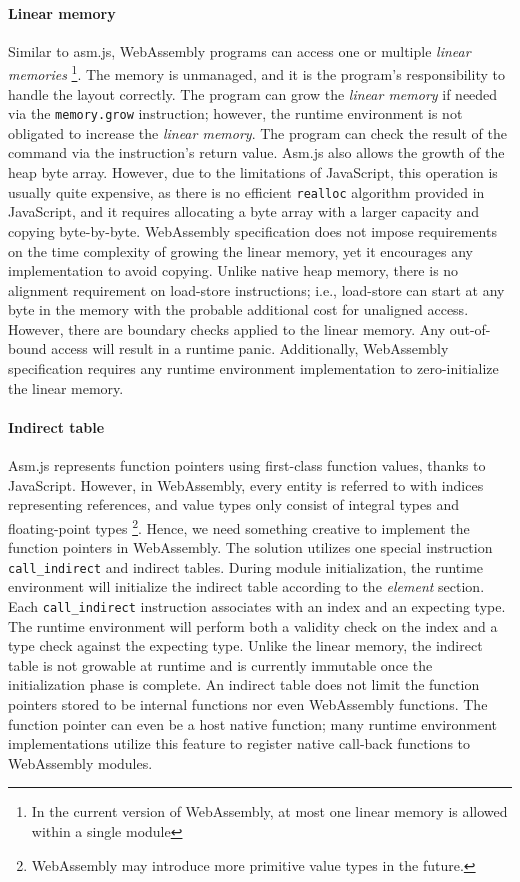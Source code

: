 \paragraph{Linear memory}
Similar to asm.js, WebAssembly programs can access one or multiple
\emph{linear memories} \footnote{In the current version of WebAssembly, at most
  one linear memory is allowed within a single module}. The memory is unmanaged,
and it is the program's responsibility to handle the layout correctly. The
program can grow the \emph{linear memory} if needed via the \texttt{memory.grow}
instruction; however, the runtime environment is not obligated to increase the
\emph{linear memory}. The program can check the result of the command via the
instruction's return value. Asm.js also allows the growth of the heap byte
array. However, due to the limitations of JavaScript, this operation is usually
quite expensive, as there is no efficient \texttt{realloc} algorithm provided in
JavaScript, and it requires allocating a byte array with a larger capacity and
copying byte-by-byte. WebAssembly specification does not impose requirements on
the time complexity of growing the linear memory, yet it encourages any
implementation to avoid copying.  Unlike native heap memory, there is no
alignment requirement on load-store instructions; i.e., load-store can start at
any byte in the memory with the probable additional cost for unaligned access.
However, there are boundary checks applied to the linear memory. Any
out-of-bound access will result in a runtime panic. Additionally, WebAssembly
specification requires any runtime environment implementation to
zero-initialize the linear memory.

\paragraph{Indirect table}
Asm.js represents function pointers using first-class function values, thanks to
JavaScript. However, in WebAssembly, every entity is referred to with indices
representing references, and value types only consist of integral types and
floating-point types \footnote{WebAssembly may introduce more primitive value
  types in the future.}. Hence, we need something creative to implement the
function pointers in WebAssembly. The solution utilizes one special instruction
\texttt{call\_indirect} and indirect tables. During module initialization, the
runtime environment will initialize the indirect table according to the
\emph{element} section. Each \texttt{call\_indirect} instruction associates
with an index and an expecting type. The runtime environment will perform both
a validity check on the index and a type check against the expecting type.
Unlike the linear memory, the indirect table is not growable at runtime and
is currently immutable once the initialization phase is complete. An indirect
table does not limit the function pointers stored to be internal functions nor
even WebAssembly functions. The function pointer can even be a host native
function; many runtime environment implementations utilize this feature to
register native call-back functions to WebAssembly modules.

